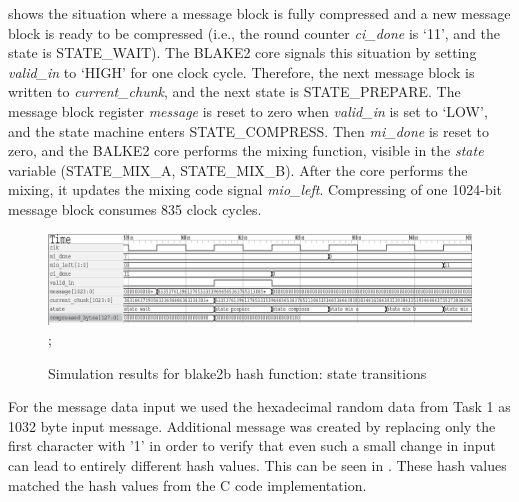 \documentclass[%
	a4paper,
]
{article}
\begin{document}
%
 shows the situation where a message block is fully compressed
and a new message block is ready to be compressed (i.e., the round counter
\emph{ci_done} is `11', and the state is \mbox{STATE_WAIT}).
%
The BLAKE2 core signals this situation by setting \emph{valid_in} to `HIGH'
for one clock cycle.
%
Therefore, the next message block is written to \emph{current_chunk}, and the
next state is \mbox{STATE_PREPARE}. The message block register \emph{message}
is reset to zero when \emph{valid_in} is set to `LOW', and the state machine
enters \mbox{STATE_COMPRESS}.
%
Then \emph{mi_done} is reset to zero, and the BALKE2 core performs the mixing
function, visible in the \emph{state} variable (\mbox{STATE_MIX_A},
\mbox{STATE_MIX_B}). After the core performs the mixing, it updates the mixing
code signal \emph{mio\_left}.
%
Compressing of one 1024-bit message block consumes 835 clock cycles.

\begin{figure}[!ht]
	\centering
	\includegraphics[width=\textwidth]{waveform2.eps};
	\caption{Simulation results for blake2b hash function: state transitions}
	\label{fig:signaling}
\end{figure}

For the message data input we used the hexadecimal random data from Task 1 as
1032 byte input message. Additional  message was created by replacing only the
first character with '1' in order to verify that even such a small change in
input can lead to entirely different hash values. This can be seen in
. These hash values matched the hash values from the C code
implementation.
\end{document}
